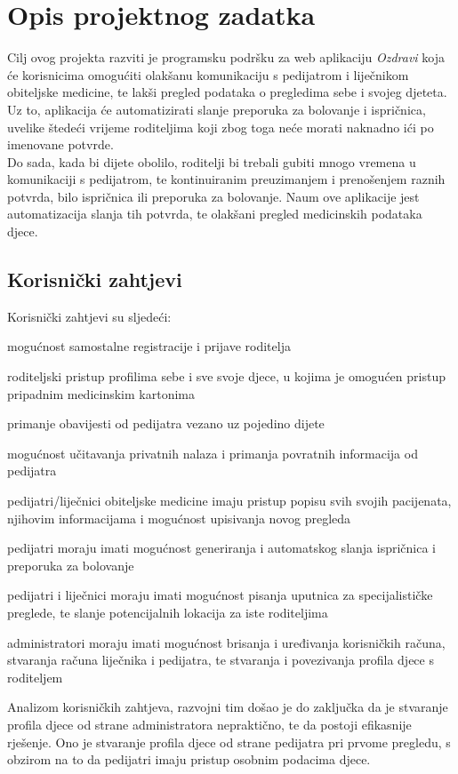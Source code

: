 \chapter{Opis projektnog zadatka}
		
		\text Cilj ovog projekta razviti je programsku podršku za web aplikaciju \textit{Ozdravi} koja će korisnicima omogućiti olakšanu komunikaciju s pedijatrom i liječnikom obiteljske medicine, te lakši pregled podataka o pregledima sebe i svojeg djeteta. Uz to, aplikacija će automatizirati slanje preporuka za bolovanje i ispričnica, uvelike štedeći vrijeme roditeljima koji zbog toga neće morati naknadno ići po imenovane potvrde.\\
		Do sada, kada bi dijete obolilo, roditelji bi trebali gubiti mnogo vremena u komunikaciji s pedijatrom, te kontinuiranim preuzimanjem i prenošenjem raznih potvrda, bilo ispričnica ili preporuka za bolovanje. Naum ove aplikacije jest automatizacija slanja tih potvrda, te olakšani pregled medicinskih podataka djece. \\
		
		\section{Korisnički zahtjevi}
		Korisnički zahtjevi su sljedeći:
		\begin{packed_item}
			
			\item  mogućnost samostalne registracije i prijave roditelja
			\item  roditeljski pristup profilima sebe i sve svoje djece, u kojima je omogućen pristup pripadnim medicinskim kartonima
			\item  primanje obavijesti od pedijatra vezano uz pojedino dijete
			\item  mogućnost učitavanja privatnih nalaza i primanja povratnih informacija od pedijatra
			\item  pedijatri/liječnici obiteljske medicine imaju pristup popisu svih svojih pacijenata, njihovim informacijama i mogućnost upisivanja novog pregleda
			\item  pedijatri moraju imati mogućnost generiranja i automatskog slanja ispričnica i preporuka za bolovanje
			\item  pedijatri i liječnici moraju imati mogućnost pisanja uputnica za specijalističke preglede, te slanje potencijalnih lokacija za iste roditeljima
			\item  administratori moraju imati mogućnost brisanja i uređivanja korisničkih računa, stvaranja računa liječnika i pedijatra, te stvaranja i povezivanja profila djece s roditeljem
			
		\end{packed_item}
		Analizom korisničkih zahtjeva, razvojni tim došao je do zaključka da je stvaranje profila djece od strane administratora nepraktično, te da postoji efikasnije rješenje. Ono je stvaranje profila djece od strane pedijatra pri prvome pregledu, s obzirom na to da pedijatri imaju pristup osobnim podacima djece. 
		

